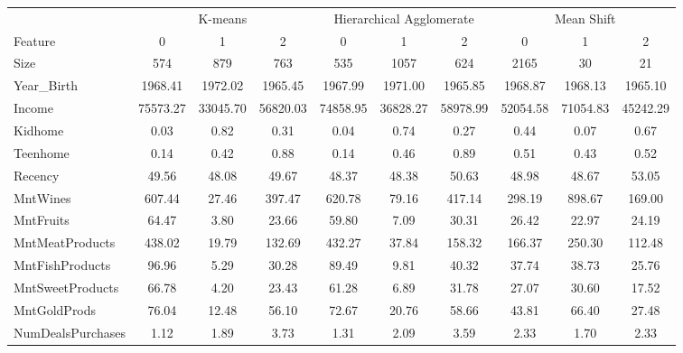 \documentclass[12pt]{article}
\begin{document}
\begin{center}    
\begin{adjustbox}{angle=90}
    \begin{tabular}{lccccccccc}
    \toprule
    {} & \multicolumn{3}{c}{K-means} & \multicolumn{3}{c}{Hierarchical Agglomerate} & \multicolumn{3}{c}{Mean Shift} \\
    Feature &        0 &        1 &        2 &           0 &        1 &        2 &          0 &        1 &        2 \\
    \midrule
    Size                &   574 &   879 &   763 &      535 &  1057 &   624 &    2165 &    30 &    21 \\
    Year\_Birth          &  1968.41 &  1972.02 &  1965.45 &     1967.99 &  1971.00 &  1965.85 &    1968.87 &  1968.13 &  1965.10 \\
    Income              & 75573.27 & 33045.70 & 56820.03 &    74858.95 & 36828.27 & 58978.99 &   52054.58 & 71054.83 & 45242.29 \\
    Kidhome             &     0.03 &     0.82 &     0.31 &        0.04 &     0.74 &     0.27 &       0.44 &     0.07 &     0.67 \\
    Teenhome            &     0.14 &     0.42 &     0.88 &        0.14 &     0.46 &     0.89 &       0.51 &     0.43 &     0.52 \\
    Recency             &    49.56 &    48.08 &    49.67 &       48.37 &    48.38 &    50.63 &      48.98 &    48.67 &    53.05 \\
    MntWines            &   607.44 &    27.46 &   397.47 &      620.78 &    79.16 &   417.14 &     298.19 &   898.67 &   169.00 \\
    MntFruits           &    64.47 &     3.80 &    23.66 &       59.80 &     7.09 &    30.31 &      26.42 &    22.97 &    24.19 \\
    MntMeatProducts     &   438.02 &    19.79 &   132.69 &      432.27 &    37.84 &   158.32 &     166.37 &   250.30 &   112.48 \\
    MntFishProducts     &    96.96 &     5.29 &    30.28 &       89.49 &     9.81 &    40.32 &      37.74 &    38.73 &    25.76 \\
    MntSweetProducts    &    66.78 &     4.20 &    23.43 &       61.28 &     6.89 &    31.78 &      27.07 &    30.60 &    17.52 \\
    MntGoldProds        &    76.04 &    12.48 &    56.10 &       72.67 &    20.76 &    58.66 &      43.81 &    66.40 &    27.48 \\
    NumDealsPurchases   &     1.12 &     1.89 &     3.73 &        1.31 &     2.09 &     3.59 &       2.33 &     1.70 &     2.33 \\

\end{tabular}
\end{adjustbox}
\end{center}
\end{document}

